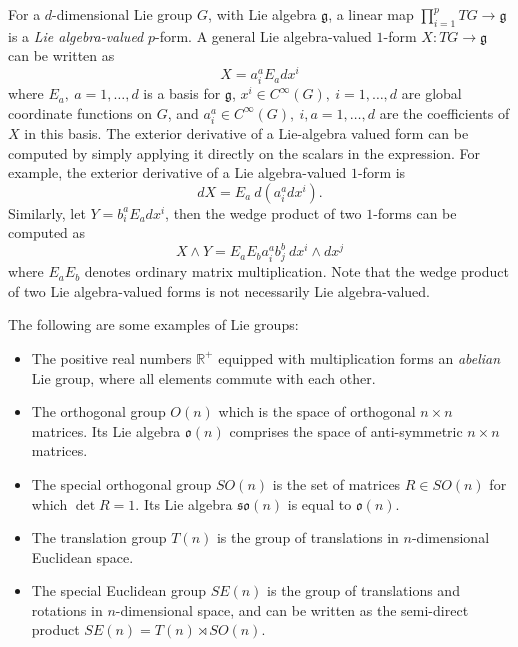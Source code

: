 For a $d$-dimensional Lie group $G$, with Lie algebra $\mathfrak{g}$, a linear map $\prod_{i=1}^p TG \to \mathfrak{g}$ is a \textit{Lie algebra-valued} $p$-form. A general Lie algebra-valued $1$-form $X : TG \to \mathfrak{g}$ can be written as
\begin{equation}
X = a_i^a E_a dx^i
\end{equation}
where $E_a,\ a=1,\dots,d$ is a basis for $\mathfrak{g}$, $x^i \in C^\infty(G),\ i=1,\dots,d$ are global coordinate functions on $G$, and $a_i^a \in C^\infty(G),\ i,a=1,\dots,d$ are the coefficients of $X$ in this basis. The exterior derivative of a Lie-algebra valued form can be computed by simply applying it directly on the scalars in the expression. For example, the exterior derivative of a Lie algebra-valued $1$-form is
\begin{equation}
dX = E_a\ d(a_i^a dx^i).
\end{equation}
Similarly, let $Y = b_i^a E_a dx^i$, then the wedge product of two $1$-forms can be computed as
\begin{equation}
X \wedge Y = E_a E_b a_i^a b_j^b\ dx^i \wedge dx^j
\end{equation}
where $E_a E_b$ denotes ordinary matrix multiplication. Note that the wedge product of two Lie algebra-valued forms is not necessarily Lie algebra-valued.

The following are some examples of Lie groups:
\begin{itemize}
\item The positive real numbers $\mathbb{R}^+$ equipped with multiplication forms an \textit{abelian} Lie group, where all elements commute with each other.

\item The orthogonal group $O(n)$ which is the space of orthogonal $n \times n$ matrices. Its Lie algebra $\mathfrak{o}(n)$ comprises the space of anti-symmetric $n \times n$ matrices.

\item The special orthogonal group $SO(n)$ is the set of matrices $R \in SO(n)$ for which $\det{R} = 1$. Its Lie algebra $\mathfrak{so}(n)$ is equal to $\mathfrak{o}(n)$.

\item The translation group $T(n)$ is the group of translations in $n$-dimensional Euclidean space.

\item The special Euclidean group $SE(n)$ is the group of translations and rotations in $n$-dimensional space, and can be written as the semi-direct product $SE(n) = T(n) \rtimes SO(n)$.
\end{itemize}

